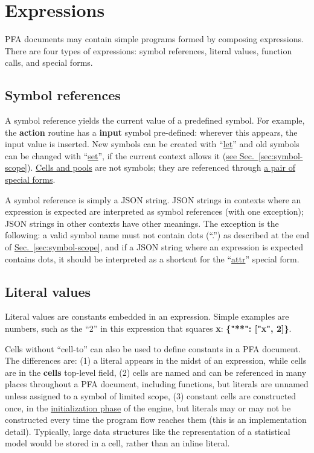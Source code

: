 \documentclass{article}
\newcommand{\PFAc}{\ttfamily\bfseries}
\theoremstyle{definition}
\begin{document}
\section{Expressions}
\label{sec:expressions}

PFA documents may contain simple programs formed by composing expressions.  There are four types of expressions: symbol references, literal values, function calls, and special forms.

\hypertarget{hsec:symbol-ref}{}
\subsection{Symbol references}
\label{sec:symbol-ref}

A symbol reference yields the current value of a predefined symbol.  For example, the {\PFAc action} routine has a {\PFAc input} symbol pre-defined: wherever this appears, the input value is inserted.  New symbols can be created with ``\hyperlink{hsec:let-set}{let}'' and old symbols can be changed with ``\hyperlink{hsec:let-set}{set}'', if the current context allows it (\hyperlink{hsec:symbol-scope}{see Sec.~\ref{sec:symbol-scope}}).  \hyperlink{hsec:cells-pools}{Cells and pools} are not symbols; they are referenced through \hyperlink{hsec:cell-pool-forms}{a pair of special forms}.

A symbol reference is simply a JSON string.  JSON strings in contexts where an expression is expected are interpreted as symbol references (with one exception); JSON strings in other contexts have other meanings.  The exception is the following: a valid symbol name must not contain dots (``.'') as described at the end of \hyperlink{hsec:symbol-scope}{Sec.~\ref{sec:symbol-scope}}, and if a JSON string where an expression is expected contains dots, it should be interpreted as a shortcut for the ``\hyperlink{hsec:attr-form}{attr}'' special form.

\hypertarget{hsec:literals}{}
\subsection{Literal values}
\label{sec:literals}

Literal values are constants embedded in an expression.  Simple examples are numbers, such as the ``2'' in this expression that squares {\PFAc x}: {\PFAc \{"**":$\!$ ["x", 2]\}}.

Cells without ``cell-to'' can also be used to define constants in a PFA document.  The differences are: (1) a literal appears in the midst of an expression, while cells are in the {\PFAc cells} top-level field, (2) cells are named and can be referenced in many places throughout a PFA document, including functions, but literals are unnamed unless assigned to a symbol of limited scope, (3) constant cells are constructed once, in the \hyperlink{hsec:phases}{initialization phase} of the engine, but literals may or may not be constructed every time the program flow reaches them (this is an implementation detail).  Typically, large data structures like the representation of a statistical model would be stored in a cell, rather than an inline literal.
\end{document}
